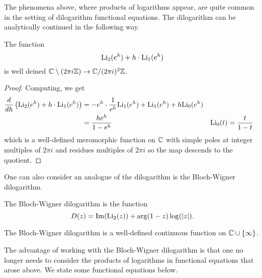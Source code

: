 The phenomena above, where products of logarithms appear, are quite common in the setting of dilogarithm functional equations. The dilogarithm can be analytically continued in the following way. 
\begin{theorem}\label{thm: analytic continuation for dilogarithm}
    The function 
    \begin{equation}\label{eqn: analytic continuation for dilogarithm}
        \mathrm{Li}_{2}(e^{h})+h\cdot\mathrm{Li}_{1}(e^{h})
    \end{equation}
    is well deined $\mathbb{C}\setminus(2\pi i\mathbb{Z})\to\mathbb{C}/(2\pi i)^{2}\mathbb{Z}$. 
\end{theorem}
\begin{proof}
    Computing, we get 
    \begin{align*}
        \frac{d}{dh}\left(\mathrm{Li}_{2}(e^{h})+h\cdot\mathrm{Li}_{1}(e^{h})\right) &= -e^{h}\cdot\frac{1}{e^{h}}\mathrm{Li}_{1}(e^{h}) + \mathrm{Li}_{1}(e^{h}) + h\mathrm{Li}_{0}(e^{h}) \\
        &= \frac{he^{h}}{1-e^{h}} && \mathrm{Li}_{0}(t)=\frac{t}{1-t}
    \end{align*}
    which is a well-defined meromorphic function on $\mathbb{C}$ with simple poles at integer multiples of $2\pi i$ and residues multiples of $2\pi i$ so the map descends to the quotient. 
\end{proof}
One can also consider an analogue of the dilogarithm is the Bloch-Wigner dilogarithm. 
\begin{definition}\label{def: Bloch-Wigner dilogarithm}
    The Bloch-Wigner dilogarithm is the function 
    $$D(z)=\mathrm{Im}(\mathrm{Li}_{2}(z))+\arg(1-z)\log(|z|).$$
\end{definition}
\begin{remark}
    The Bloch-Wigner dilogarithm is a well-defined continuous function on $\mathbb{C}\cup\{\infty\}$.
\end{remark}
The advantage of working with the Bloch-Wigner dilogarithm is that one no longer needs to consider the products of logarithms in functional equations that arose above. We state some functional equations below. 

